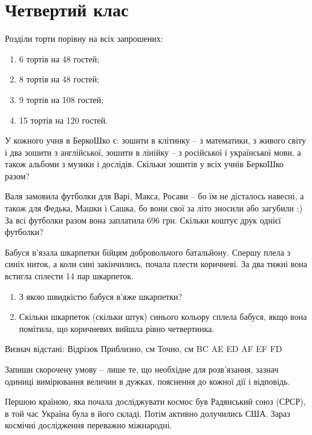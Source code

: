 \chapter{Четвертий клас}

\problem
Розділи торти порівну на всіх запрошених:
\begin{enumerate}
    \item 6 тортів на 48 гостей;
    \item 8 тортів на 48 гостей;
    \item 9 тортів на 108 гостей;
    \item 15 тортів на 120 гостей.
\end{enumerate}


\problem
У кожного учня в БеркоШко є: зошити в клітинку – з математики,
з живого світу і два зошити з англійської, зошити в лінійку – 
з російської і української мови, а також альбоми з музики і дослідів.
Скільки зошитів у всіх учнів БеркоШко разом?


\problem
Валя замовила футболки для Варі, Макса, Росави – бо їм не дісталось навесні,
а також для Федька, Машки і Сашка, бо вони свої за літо зносили або загубили :)
За всі футболки разом вона заплатила 696 грн.
Скільки коштує друк однієї футболки? 


\problem
Бабуся в’язала шкарпетки бійцям добровольчого батальйону.
Спершу плела з синіх ниток, а коли сині закінчились, почала плести коричневі.
За два тижні вона встигла сплести 14 пар шкарпеток.
\begin{enumerate}
    \item З якою швидкістю бабуся в’яже шкарпетки? 
    \item Скільки шкарпеток (скільки штук) синього кольору сплела бабуся,
    якщо вона помітила, що коричневих вийшла рівно четвертинка.
\end{enumerate}


\problem
Визнач відстані:
Відрізок
Приблизно, см
Точно, см
BC
AE
ED
AF
EF
FD


\problem
Запиши скорочену умову – лише те, що необхідне для розв’язання,
зазнач одиниці вимірювання величин в дужках, пояснення до кожної дії
і відповідь.

Першою країною, яка почала досліджувати космос був Радянський союз (СРСР),
в той час Україна була в його складі. Потім активно долучились США.
Зараз космічні дослідження переважно міжнародні.

